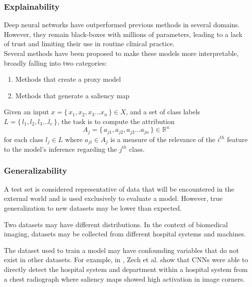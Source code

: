 \documentclass[8pt]{beamer}
\begin{document}
  \begin{frame}

    \frametitle{Explainability} Deep neural networks have outperformed previous
    methods in several domains. However, they remain black-boxes with millions
    of parameters, leading to a lack of trust and limiting their use in routine
    clinical practice. \\ \pause \vspace{\baselineskip} Several methods have
    been proposed to make these models more interpretable, broadly falling into
    two categories:
    \begin{enumerate}
    \item{Methods that create a proxy model} \pause
    \item{Methods that generate a saliency map} \pause
    \end{enumerate}
    \vspace{\baselineskip} Given an input $x = \{\, x_{1}, x_{2}, x_{3} \dots
    x_{n} \,\} \in X$, and a set of class labels $L = \{\,l_1 ,l_2 ,l_3 \dots
    l_c\,\}$, the task is to compute the attribution
    \begin{equation}
      A_j = \{\,a_{j1}, a_{j2}, a_{j3} \dots a_{jn}\,\} \in \mathbb{R} ^n
    \end{equation}
    for each class $l_j \in L$ where $a_{ji} \in A_j$ is a measure of the
    relevance of
    the $i^{th}$ feature to the model's inference regarding the $j^{th}$ class.\\


  \end{frame}

  \begin{frame}
    \frametitle{Generalizability} A test set is considered representative of
    data that will be encountered in the external world and is used exclusively
    to evaluate a model. However, true generalization to new datasets may be
    lower than expected. \\ \pause

    \vspace{\baselineskip}

    Two datasets may have different distributions. In the context of biomedical
    imaging, datasets may be collected from different hospital systems and
    machines. \\ \pause

    \vspace{\baselineskip}

    The dataset used to train a model may have confounding variables that do not
    exist in other datasets. For example, in \cite{zech2018variable}, Zech et
    al. show that CNNs were able to directly detect the hospital system and
    department within a hospital system from a chest radiograph where saliency
    maps showed high activation in image corners.
    
  \end{frame}
\end{document}
